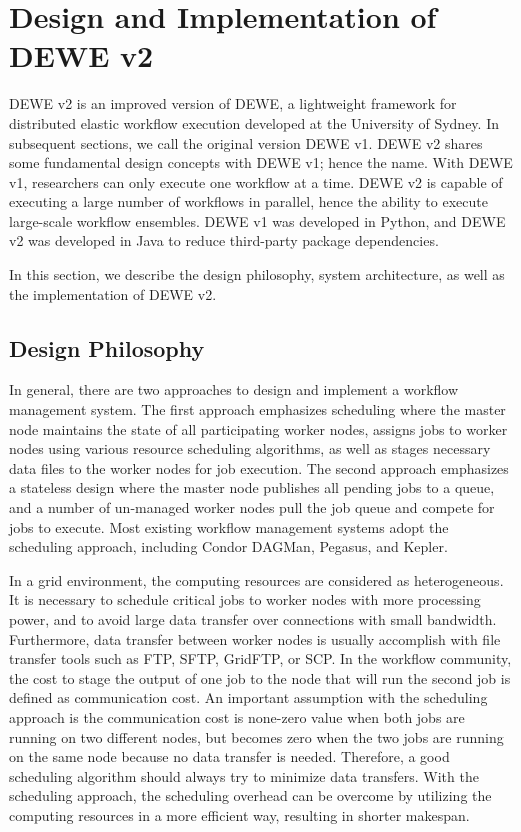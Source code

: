 \section{Design and Implementation of DEWE v2}
\label{v2_sec:dewe_v2_design}

DEWE v2 is an improved version of DEWE, a lightweight framework for distributed elastic workflow execution developed at the University of Sydney. In subsequent sections, we call the original version DEWE v1.  DEWE v2 shares some fundamental design concepts with DEWE v1; hence the name. With DEWE v1, researchers can only execute one workflow at a time. DEWE v2 is capable of executing a large number of workflows in parallel, hence the ability to execute large-scale workflow ensembles. DEWE v1 was developed in Python, and DEWE v2 was developed in Java to reduce third-party package dependencies. 

In this section, we describe the design philosophy, system architecture, as well as the implementation of DEWE v2. 


\subsection{Design Philosophy}
\label{sec:subsec:design_philosophy}


In general, there are two approaches to design and implement a workflow management system. The first approach emphasizes scheduling where the master node maintains the state of all participating worker nodes, assigns jobs to worker nodes using various resource scheduling algorithms, as well as stages necessary data files to the worker nodes for job execution. The second approach emphasizes a stateless design where the master node publishes all pending jobs to a queue, and a number of un-managed worker nodes pull the job queue and compete for jobs to execute. Most existing workflow management systems adopt the scheduling approach, including Condor DAGMan, Pegasus, and Kepler. 

In a grid environment, the computing resources are considered as heterogeneous. It is necessary to schedule critical jobs to worker nodes with more processing power, and to avoid large data transfer over connections with small bandwidth. Furthermore, data transfer between worker nodes is usually accomplish with file transfer tools such as FTP, SFTP, GridFTP, or SCP. In the workflow community, the cost to stage the output of one job to the node that will run the second job is defined as communication cost. An important assumption with the scheduling approach is the communication cost is none-zero value when both jobs are running on two different nodes, but becomes zero when the two jobs are running on the same node because no data transfer is needed. Therefore, a good scheduling algorithm should always try to minimize data transfers. With the scheduling approach, the scheduling overhead can be overcome by utilizing the computing resources in a more efficient way, resulting in shorter makespan. 

